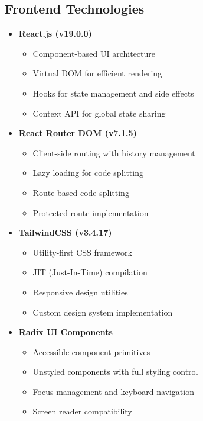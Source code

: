 \documentclass[12pt,a4paper]{article}
\begin{document}
\subsection{Frontend Technologies}
\begin{multicols}{2}
\begin{itemize}
    \item \textbf{React.js (v19.0.0)}
    \begin{itemize}
        \item Component-based UI architecture
        \item Virtual DOM for efficient rendering
        \item Hooks for state management and side effects
        \item Context API for global state sharing
    \end{itemize}
    
    \item \textbf{React Router DOM (v7.1.5)}
    \begin{itemize}
        \item Client-side routing with history management
        \item Lazy loading for code splitting
        \item Route-based code splitting
        \item Protected route implementation
    \end{itemize}
    
    \item \textbf{TailwindCSS (v3.4.17)}
    \begin{itemize}
        \item Utility-first CSS framework
        \item JIT (Just-In-Time) compilation
        \item Responsive design utilities
        \item Custom design system implementation
    \end{itemize}
    
    \item \textbf{Radix UI Components}
    \begin{itemize}
        \item Accessible component primitives
        \item Unstyled components with full styling control
        \item Focus management and keyboard navigation
        \item Screen reader compatibility
    \end{itemize}
    

\end{itemize}
\end{multicols}
\end{document}
